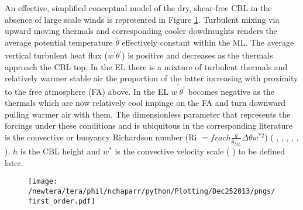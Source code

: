 An effective, simplified conceptual model of the dry, shear-free \acs{CBL} in the absence of large scale winds is represented in Figure \ref{fig:1stord}.  Turbulent mixing via upward moving thermals and corresponding cooler dowdraughts renders the average potential temperature $\overline{\theta}$ effectively constant within the \acs{ML}.  The average vertical turbulent heat flux ($\overline{w^{'}\theta^{'}}$) is positive and decreases as the thermals approach the \acs{CBL} top.  In the \acs{EL} there is a mixture of turbulent thermals and relatively warmer stable air the proportion of the latter increasing with proximity to the free atmosphere (\acs{FA}) above.  In the \acs{EL} $\overline{w^{'}\theta^{'}}$ becomes negative as the thermals which are now relatively cool impinge on the \acs{FA} and turn downward pulling warmer air with them.  The dimensionless parameter that represents the forcings under these conditions and is ubiquitous in the corresponding literature is the convective or buoyancy Richardson number (\acs{Ri} $=frac{h\frac{g}{\overline{\theta}_{ML}}\Delta \theta}{w^{*2}}$) (\citeauthor{DearWill80} \citeyear{DearWill80}, \citeauthor{Stull-BLMetIntro} \citeyear{Stull-BLMetIntro}, \citeauthor{SullMoengStev} \citeyear{SullMoengStev}, \citeauthor{FedConzMir04} \citeyear{FedConzMir04}, \citeauthor{BrooksFowler2} \citeyear{BrooksFowler2}, \citeauthor{GarciaMellado} \citeyear{GarciaMellado}).  $h$ is the \acs{CBL} height and $w^{*}$ is the convective velocity scale (\citeauthor{Deardorff70} \citeyear{Deardorff70}) to be defined later.\\   


\begin{figure}[htbp]
    \centering
    \texttt{[image: /newtera/tera/phil/nchaparr/python/Plotting/Dec252013/pngs/first\_order.pdf]}
    \caption{}
    \label{fig:1stord}   %
\end{figure}

